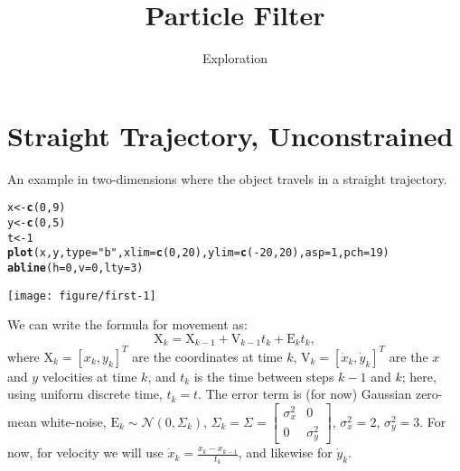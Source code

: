 \documentclass[11pt]{article}\usepackage[]{graphicx}\usepackage[]{color}
\title{Particle Filter}
\author{Exploration}
\date{}
\makeatletter
\def\maxwidth{ %
  \ifdim\Gin@nat@width>\linewidth
    \linewidth
  \else
    \Gin@nat@width
  \fi
}
\newcommand{\hlnum}[1]{\textcolor[rgb]{0.686,0.059,0.569}{#1}}%
\newcommand{\hlstr}[1]{\textcolor[rgb]{0.192,0.494,0.8}{#1}}%
\newcommand{\hlopt}[1]{\textcolor[rgb]{0,0,0}{#1}}%
\newcommand{\hlstd}[1]{\textcolor[rgb]{0.345,0.345,0.345}{#1}}%
\newcommand{\hlkwb}[1]{\textcolor[rgb]{0.69,0.353,0.396}{#1}}%
\newcommand{\hlkwc}[1]{\textcolor[rgb]{0.333,0.667,0.333}{#1}}%
\newcommand{\hlkwd}[1]{\textcolor[rgb]{0.737,0.353,0.396}{\textbf{#1}}}%
\newenvironment{kframe}{%
 \def\at@end@of@kframe{}%
 \ifinner\ifhmode%
  \def\at@end@of@kframe{\end{minipage}}%
  \begin{minipage}{\columnwidth}%
 \fi\fi%
 \def\FrameCommand##1{\hskip\@totalleftmargin \hskip-\fboxsep
 \colorbox{shadecolor}{##1}\hskip-\fboxsep
     \hskip-\linewidth \hskip-\@totalleftmargin \hskip\columnwidth}%
 \MakeFramed {\advance\hsize-\width
   \@totalleftmargin\z@ \linewidth\hsize
   \@setminipage}}%
 {\par\unskip\endMakeFramed%
 \at@end@of@kframe}
\newenvironment{knitrout}{}{} %
\newcommand{\X}{\mathrm{X}}
\newcommand{\E}{\mathrm{E}}
\newcommand{\V}{\mathrm{V}}
\makeatother
\begin{document}
\maketitle


\section{Straight Trajectory, Unconstrained}

An example in two-dimensions where the object travels in a straight trajectory. 


\begin{knitrout}
\color{fgcolor}\begin{kframe}
\begin{alltt}
\hlstd{x} \hlkwb{<-} \hlkwd{c}\hlstd{(}\hlnum{0}\hlstd{,} \hlnum{9}\hlstd{)}
\hlstd{y} \hlkwb{<-} \hlkwd{c}\hlstd{(}\hlnum{0}\hlstd{,} \hlnum{5}\hlstd{)}
\hlstd{t} \hlkwb{<-} \hlnum{1}
\hlkwd{plot}\hlstd{(x, y,} \hlkwc{type} \hlstd{=} \hlstr{"b"}\hlstd{,} \hlkwc{xlim} \hlstd{=} \hlkwd{c}\hlstd{(}\hlnum{0}\hlstd{,} \hlnum{20}\hlstd{),} \hlkwc{ylim} \hlstd{=} \hlkwd{c}\hlstd{(}\hlopt{-}\hlnum{20}\hlstd{,} \hlnum{20}\hlstd{),} \hlkwc{asp} \hlstd{=} \hlnum{1}\hlstd{,} \hlkwc{pch} \hlstd{=} \hlnum{19}\hlstd{)}
\hlkwd{abline}\hlstd{(}\hlkwc{h} \hlstd{=} \hlnum{0}\hlstd{,} \hlkwc{v} \hlstd{=} \hlnum{0}\hlstd{,} \hlkwc{lty} \hlstd{=} \hlnum{3}\hlstd{)}
\end{alltt}
\end{kframe}

{\centering \texttt{[image: figure/first-1]} 

}



\end{knitrout}

We can write the formula for movement as:
\begin{equation}
  \label{eq:straight_state}
  \X_k = \X_{k-1} + \V_{k-1}t_{k} + \E_kt_{k},
\end{equation}
where 
$\X_k = \left[x_k, y_k\right]^T$ are the coordinates at time $k$,
$\V_k = \left[\dot x_k, \dot y_k\right]^T$ are the $x$ and $y$ velocities at time $k$,
and $t_k$ is the time between steps $k-1$ and $k$; here, using uniform discrete time, $t_k = t$.
The error term is (for now) Gaussian zero-mean white-noise, $\E_k \sim \mathcal{N}\left(0, \Sigma_k\right)$,
$\Sigma_k = \Sigma =
\begin{bmatrix}
  \sigma_x^2 & 0 \\ 0 & \sigma_y^2
\end{bmatrix}$,
$\sigma_x^2 = 2$, $\sigma_y^2 = 3$.
For now, for velocity we will use $\dot x_k = \frac{x_k - x_{k-1}}{t_k}$, and likewise for $\dot y_k$.
\end{document}
